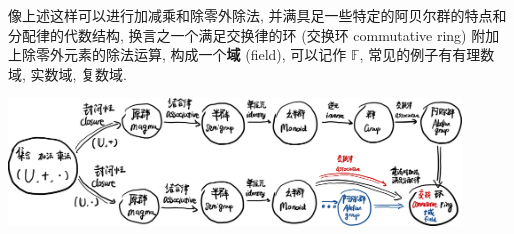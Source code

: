 \begin{tcolorbox}[size=fbox, breakable, enhanced jigsaw, title={运算规律}]
像上述这样可以进行加减乘和除零外除法,
并满具足一些特定的阿贝尔群的特点和分配律的代数结构,
换言之一个满足交换律的环 (交换环 commutative ring)
附加上除零外元素的除法运算, 构成一个\textbf{域} (field), 可以记作
$\mathbb{F}$, 常见的例子有有理数域, 实数域, 复数域.

\begin{tcolorbox}[size=fbox, breakable, enhanced jigsaw]
\includegraphics[width=0.9\textwidth]{img/image-20230328100716650.png}

\end{tcolorbox}

\end{tcolorbox}